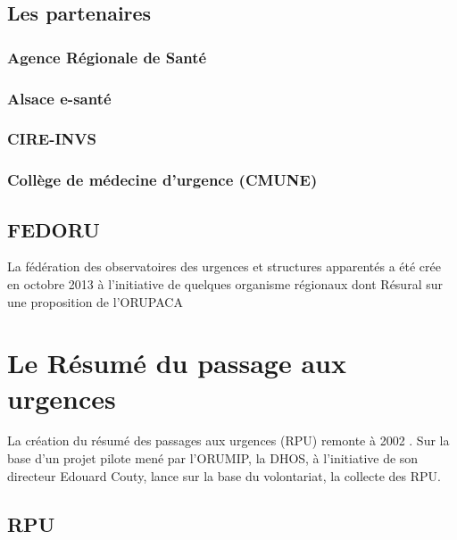 \documentclass[12pt,english,french,twoside]{report}\usepackage[]{graphicx}\usepackage[]{color}
\begin{document}
\section*{Les partenaires}

  \subsection*{Agence Régionale de Santé}
    
  \subsection*{Alsace e-santé}
    
  \subsection*{CIRE-INVS}
    
  \subsection*{Collège de médecine d'urgence (CMUNE)}

\section*{FEDORU}
  
La fédération des observatoires des urgences et structures apparentés a été crée en octobre 2013 à l'initiative de quelques organisme régionaux dont Résural sur une proposition de l'ORUPACA 


\newpage
\chapter{Le Résumé du passage aux urgences}



La création du résumé des passages aux urgences (RPU) remonte à 2002 \cite{11}. Sur la base d'un projet pilote mené par l'ORUMIP, la DHOS, à l'initiative de son directeur Edouard Couty, lance sur la base du volontariat, la collecte des RPU.

\section*{RPU}
\end{document}
